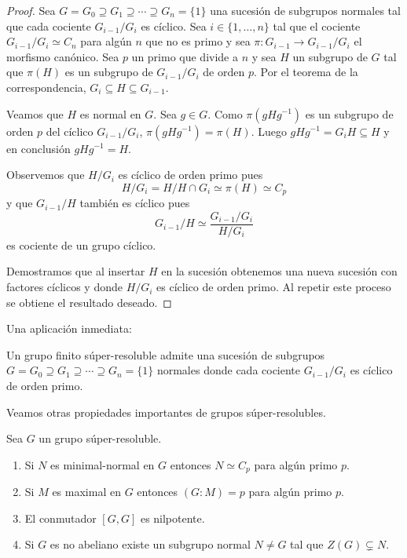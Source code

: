 \begin{proof}
	Sea $G=G_0\supseteq G_1\supseteq\cdots\supseteq G_n=\{1\}$ una sucesión de
	subgrupos normales tal que cada cociente $G_{i-1}/G_i$ es cíclico. Sea
	$i\in\{1,\dots,n\}$ tal que el cociente $G_{i-1}/G_i\simeq C_n$ para algún
	$n$ que no es primo y sea $\pi\colon G_{i-1}\to G_{i-1}/G_i$ el morfismo
	canónico.  Sea $p$ un primo que divide a $n$ y sea $H$ un subgrupo de $G$
	tal que $\pi(H)$ es un subgrupo de $G_{i-1}/G_i$ de orden $p$. Por el
	teorema de la correspondencia, $G_{i}\subseteq H\subseteq G_{i-1}$. 
	
	Veamos que $H$ es normal en $G$. Sea $g\in G$. Como $\pi(gHg^{-1})$ es un
	subgrupo de orden $p$ del cíclico $G_{i-1}/G_i$, $\pi(gHg^{-1})=\pi(H)$. Luego
	$gHg^{-1}=G_{i}H\subseteq H$ y en conclusión $gHg^{-1}=H$. 

    Observemos que $H/G_i$ es cíclico de orden
	primo pues 
	\[
		H/G_i=H/H\cap G_i\simeq \pi(H)\simeq C_p
	\]
	y que $G_{i-1}/H$ también es cíclico pues 
	\[
	G_{i-1}/H\simeq\frac{G_{i-1}/G_i}{H/G_i}
	\]
	es cociente de un grupo cíclico.
	
	Demostramos que al insertar $H$ en la
	sucesión obtenemos una nueva sucesión con factores cíclicos y donde
	$H/G_{i}$ es cíclico de orden primo. Al repetir este proceso se obtiene el
	resultado deseado.
\end{proof}

Una aplicación inmediata:

\begin{corollary}
	Un grupo finito súper-resoluble admite una sucesión de subgrupos 
	$G=G_0\supseteq G_1\supseteq\cdots\supseteq G_n=\{1\}$ 
	normales donde cada cociente $G_{i-1}/G_i$ es cíclico de orden primo.
\end{corollary}


Veamos otras propiedades importantes de grupos súper-resolubles. 

\begin{theorem}
	\label{theorem:super_structure}
	Sea $G$ un grupo súper-resoluble. 
	\begin{enumerate}
		\item Si $N$ es minimal-normal en $G$ entonces $N\simeq C_p$ para algún primo $p$.
		\item Si $M$ es maximal en $G$ entonces $(G:M)=p$ para algún primo $p$.
		\item El conmutador $[G,G]$ es nilpotente.
		\item Si $G$ es no abeliano existe un subgrupo normal $N\ne G$ tal que
			$Z(G)\subsetneq N$.
	\end{enumerate}
\end{theorem}

